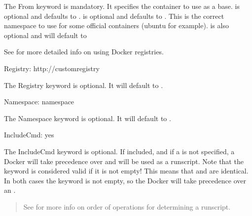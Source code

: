 \documentclass[letterpaper,10pt,english]{sphinxmanual}
\begin{document}
The From keyword is mandatory. It specifies the container to use as a base.  is optional and defaults to .
 is optional and defaults to . This is the correct namespace to use for some official containers (ubuntu for example).
 is also optional and will default to 

See {\hyperref[\detokenize{singularity_and_docker:singularity-and-docker}]{}} for more detailed info on using Docker registries.

%
\begin{sphinxVerbatim}[commandchars=\\\{\}]
Registry: http://custom\PYGZus{}registry
\end{sphinxVerbatim}

The Registry keyword is optional. It will default to .

%
\begin{sphinxVerbatim}[commandchars=\\\{\}]
Namespace: namespace
\end{sphinxVerbatim}

The Namespace keyword is optional. It will default to .

%
\begin{sphinxVerbatim}[commandchars=\\\{\}]
IncludeCmd: yes
\end{sphinxVerbatim}

The IncludeCmd keyword is optional. If included, and if a  is not specified, a Docker  will take precedence over 
and will be used as a runscript. Note that the  keyword is considered valid if it is not empty! This means that
 and  are identical. In both cases the  keyword is not empty, so the Docker  will take precedence
over an .
\begin{quote}

See {\hyperref[\detokenize{singularity_and_docker:singularity-and-docker}]{}} for more info on order of operations for determining a runscript.
\end{quote}
\end{document}
